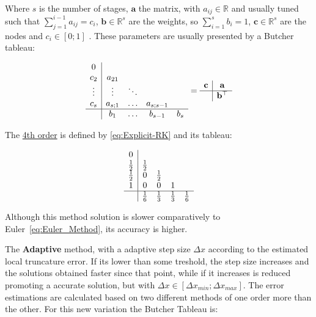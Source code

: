 Where \(s\) is the number of stages, \(\mathbf{a}\) the  matrix, with \(a_{ij} \in \mathbb{R}\) and usually tuned such that \(\sum^{i-1}_{j=1} a_{ij} = c_i\), \(\mathbf{b} \in \mathbb{R}^s\) are the weights, so \(\sum^s_{i=1} b_i = 1\), \(\mathbf{c} \in \mathbb{R}^s\) are the nodes and \(c_i \in [0;1]\) . These parameters are usually presented by a Butcher tableau:

\begin{equation}
    \begin{array}{c|cccc}
        0\\
        c_2 & a_{21}\\
        \vdots & \vdots &\ddots \\
        c_s & a_{s;1} & \hdots & a_{s;s-1}\\
        \hline
        & b_1 & \hdots & b_{s-1} & b_s  
    \end{array} = 
    \begin{array}{c|c}
        \mathbf{c} & \mathbf{a} \\
        \hline
        & \mathbf{b}^\top  
    \end{array}
    \label{eq:Explicit_Butcher_Tableu}
\end{equation}


The \underline{ 4th order} is defined by \ref{eq:Explicit-RK} and its tableau:

\begin{equation}
    \begin{array}{c|cccc}
        0\\
        \frac{1}{2} & \frac{1}{2}\\
        \frac{1}{2} & 0 & \frac{1}{2} \\
        1 & 0 & 0 & 1\\
        \hline
        & \frac{1}{6} & \frac{1}{3} & \frac{1}{3} & \frac{1}{6}  
    \end{array}
    \label{eq:RK4_Tableu}
\end{equation}

Although this method solution is slower comparatively to Euler~\ref{eq:Euler_Method}, its accuracy is higher. \par
The \textbf{Adaptive } \label{subsubsub:RK_Adaptive} method, with a adaptive step size \(\Delta x\) according to the estimated local truncature error. If its lower than some treshold, the step size increases and the solutions obtained faster since that point, while if it increases is reduced promoting a accurate solution, but with \(\Delta x \in [\Delta x_{min}; \Delta x_{max}]\).  The error estimations are calculated based on two different methods of one order more than the other. For this new  variation the Butcher Tableau is: 

